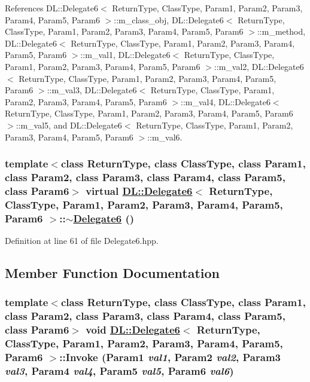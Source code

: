 References DL::Delegate6$<$ Return\-Type, Class\-Type, Param1, Param2, Param3, Param4, Param5, Param6 $>$::m\_\-class\_\-obj, DL::Delegate6$<$ Return\-Type, Class\-Type, Param1, Param2, Param3, Param4, Param5, Param6 $>$::m\_\-method, DL::Delegate6$<$ Return\-Type, Class\-Type, Param1, Param2, Param3, Param4, Param5, Param6 $>$::m\_\-val1, DL::Delegate6$<$ Return\-Type, Class\-Type, Param1, Param2, Param3, Param4, Param5, Param6 $>$::m\_\-val2, DL::Delegate6$<$ Return\-Type, Class\-Type, Param1, Param2, Param3, Param4, Param5, Param6 $>$::m\_\-val3, DL::Delegate6$<$ Return\-Type, Class\-Type, Param1, Param2, Param3, Param4, Param5, Param6 $>$::m\_\-val4, DL::Delegate6$<$ Return\-Type, Class\-Type, Param1, Param2, Param3, Param4, Param5, Param6 $>$::m\_\-val5, and DL::Delegate6$<$ Return\-Type, Class\-Type, Param1, Param2, Param3, Param4, Param5, Param6 $>$::m\_\-val6.\hypertarget{classDL_1_1Delegate6_a1}{
\subsubsection[$\sim$Delegate6]{\setlength{\rightskip}{0pt plus 5cm}template$<$class Return\-Type, class Class\-Type, class Param1, class Param2, class Param3, class Param4, class Param5, class Param6$>$ virtual \hyperlink{classDL_1_1Delegate6}{DL::Delegate6}$<$ Return\-Type, Class\-Type, Param1, Param2, Param3, Param4, Param5, Param6 $>$::$\sim$\hyperlink{classDL_1_1Delegate6}{Delegate6} ()}}
\label{classDL_1_1Delegate6_a1}




Definition at line 61 of file Delegate6.hpp.

\subsection{Member Function Documentation}
\hypertarget{classDL_1_1Delegate6_a3}{
\subsubsection[Invoke]{\setlength{\rightskip}{0pt plus 5cm}template$<$class Return\-Type, class Class\-Type, class Param1, class Param2, class Param3, class Param4, class Param5, class Param6$>$ void \hyperlink{classDL_1_1Delegate6}{DL::Delegate6}$<$ Return\-Type, Class\-Type, Param1, Param2, Param3, Param4, Param5, Param6 $>$::Invoke (Param1 {\em val1}, Param2 {\em val2}, Param3 {\em val3}, Param4 {\em val4}, Param5 {\em val5}, Param6 {\em val6})}}
\label{classDL_1_1Delegate6_a3}





